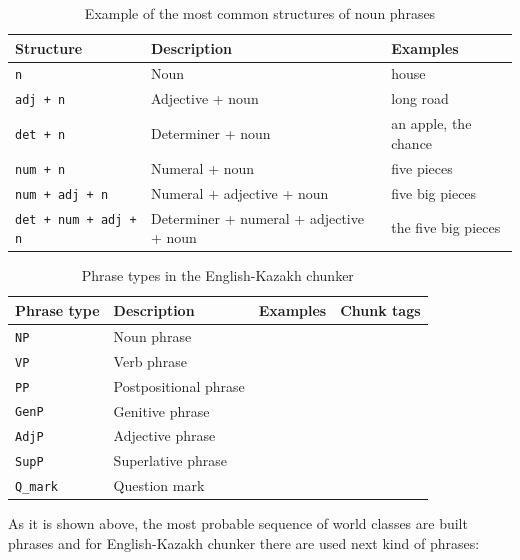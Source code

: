 \documentclass[11pt]{article}
\begin{document}
\begin{table}
  \centering
  \begin{tabular}{|l|l|l|}
  \hline
  \textbf{Structure} & \textbf{Description} & \textbf{Examples} \\
  \hline
  \texttt{n} & Noun & house \\
  \texttt{adj + n} & Adjective + noun & long road \\
  \texttt{det + n} & Determiner + noun & an apple, the chance \\
  \texttt{num + n} & Numeral + noun & five pieces \\
  \texttt{num + adj + n} & Numeral + adjective + noun & five big pieces \\
  \texttt{det + num + adj + n} & Determiner + numeral + adjective + noun & the five big pieces \\
  \hline
  \end{tabular}
  \caption{Example of the most common structures of noun phrases}
  \label{table:nps}
\end{table}

\begin{table}
  \centering
  \begin{tabular}{|l|l|l|l|}
    \hline
    \textbf{Phrase type} & \textbf{Description} & \textbf{Examples} & \textbf{Chunk tags} \\
    \hline
    \texttt{NP} & Noun phrase           &  & \\
    \texttt{VP} & Verb phrase           & & \\
    \texttt{PP} & Postpositional phrase & & \\
    \texttt{GenP} & Genitive phrase  & & \\
    \texttt{AdjP} & Adjective phrase  & & \\
    \texttt{SupP} & Superlative phrase & & \\
    \texttt{Q\_mark} & Question mark  & & \\
    \hline
  \end{tabular}
  \caption{Phrase types in the English-Kazakh chunker}
  \label{table:phrases} 
\end{table}

As it is shown above, the most probable sequence of world classes are built phrases and 
for English-Kazakh chunker there are used next kind of phrases:

\end{document}
